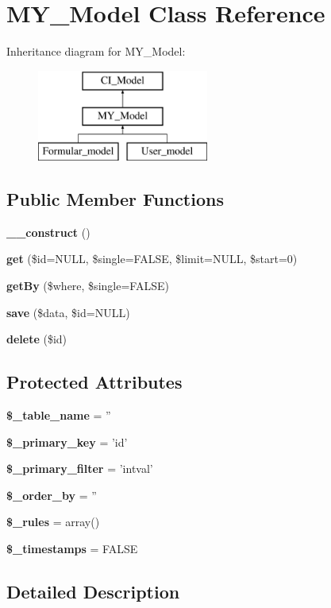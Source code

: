 \section{M\-Y\-\_\-\-Model Class Reference}
\label{class_m_y___model}
Inheritance diagram for M\-Y\-\_\-\-Model\-:\begin{figure}[H]
\begin{center}
\leavevmode
\includegraphics[height=3.000000cm]{class_m_y___model}
\end{center}
\end{figure}
\subsection*{Public Member Functions}
\begin{DoxyCompactItemize}
\item 
{\bf \-\_\-\-\_\-construct} ()
\item 
{\bf get} (\$id=N\-U\-L\-L, \$single=F\-A\-L\-S\-E, \$limit=N\-U\-L\-L, \$start=0)
\item 
{\bf get\-By} (\$where, \$single=F\-A\-L\-S\-E)
\item 
{\bf save} (\$data, \$id=N\-U\-L\-L)
\item 
{\bf delete} (\$id)
\end{DoxyCompactItemize}
\subsection*{Protected Attributes}
\begin{DoxyCompactItemize}
\item 
{\bf \$\-\_\-table\-\_\-name} = ''
\item 
{\bf \$\-\_\-primary\-\_\-key} = 'id'
\item 
{\bf \$\-\_\-primary\-\_\-filter} = 'intval'
\item 
{\bf \$\-\_\-order\-\_\-by} = ''
\item 
{\bf \$\-\_\-rules} = array()
\item 
{\bf \$\-\_\-timestamps} = F\-A\-L\-S\-E
\end{DoxyCompactItemize}


\subsection{Detailed Description}


